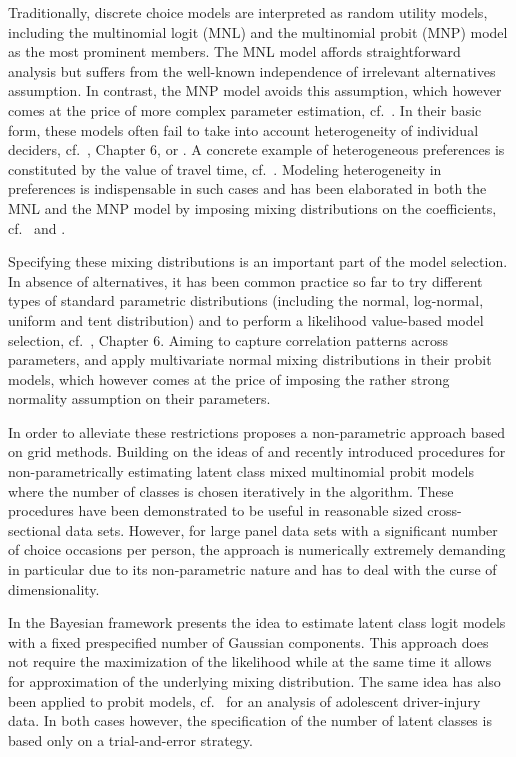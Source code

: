 \documentclass[article]{jss}
\begin{document}
Traditionally, discrete choice models are interpreted as random utility models, including the multinomial logit (MNL) and the multinomial probit (MNP) model as the most prominent members. The MNL model affords straightforward analysis but suffers from the well-known independence of irrelevant alternatives assumption. In contrast, the MNP model avoids this assumption, which however comes at the price of more complex parameter estimation, cf.\ \cite{Train:2009}. In their basic form, these models often fail to take into account heterogeneity of individual deciders, cf.\ \cite{Train:2009}, Chapter 6, or \cite{Train:2016}. A concrete example of heterogeneous preferences is constituted by the value of travel time, cf.\ \cite{Cirillo:2006}. Modeling heterogeneity in preferences is indispensable in such cases and has been elaborated in both the MNL and the MNP model by imposing mixing distributions on the coefficients, cf.\ \cite{Train:2009} and \cite{Bhat:2011}.

Specifying these mixing distributions is an important part of the model selection. In absence of alternatives, it has been common practice so far to try different types of standard parametric distributions (including the normal, log-normal, uniform and tent distribution) and to perform a likelihood value-based model selection, cf.\ \cite{Train:2009}, Chapter 6. Aiming to capture correlation patterns across parameters, \cite{Fountas:2018} and \cite{Fountas:2019} apply multivariate normal mixing distributions in their probit models, which however comes at the price of imposing the rather strong normality assumption on their parameters.

In order to alleviate these restrictions \cite{Train:2016} proposes a non-parametric approach based on grid methods. Building on the ideas of \cite{Train:2016} and \cite{Bhat:2018} recently \cite{Bauer:2019} introduced procedures for non-parametrically estimating latent class mixed multinomial probit models where the number of classes is chosen iteratively in the algorithm. These procedures have been demonstrated to be useful in reasonable sized cross-sectional data sets. However, for large panel data sets with a significant number of choice occasions per person, the approach is numerically extremely demanding in particular due to its non-parametric nature and has to deal with the curse of dimensionality.

In the Bayesian framework \cite{Scaccia:2010} presents the idea to estimate latent class logit models with a fixed prespecified number of Gaussian components. This approach does not require the maximization of the likelihood while at the same time it allows for approximation of the underlying mixing distribution. The same idea has also been applied to probit models, cf.\ \cite{Xiong:2013} for an analysis of adolescent driver-injury data. In both cases however, the specification of the number of latent classes is based only on a trial-and-error strategy.
\end{document}
